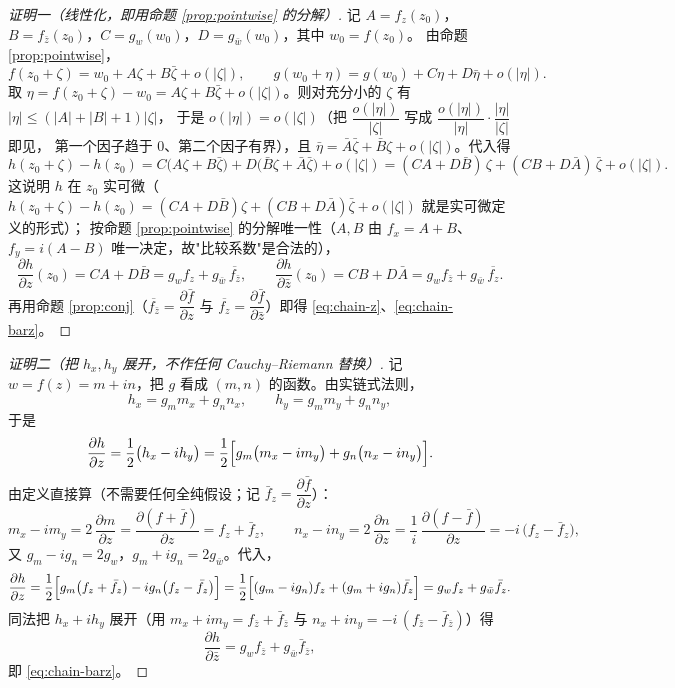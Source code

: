\begin{proof}[证明一（线性化，即用命题 \ref{prop:pointwise} 的分解）]
记 $A=f_z(z_0)$，$B=f_{\bar z}(z_0)$，$C=g_w(w_0)$，$D=g_{\bar w}(w_0)$，其中 $w_0=f(z_0)$。
由命题 \ref{prop:pointwise}，
\[
f(z_0+\zeta)=w_0+A\zeta+B\bar\zeta+o(|\zeta|),\qquad
g(w_0+\eta)=g(w_0)+C\eta+D\bar\eta+o(|\eta|).
\]
取 $\eta=f(z_0+\zeta)-w_0=A\zeta+B\bar\zeta+o(|\zeta|)$。则对充分小的 $\zeta$ 有 $|\eta|\le(|A|+|B|+1)|\zeta|$，
于是 $o(|\eta|)=o(|\zeta|)$（把 $\dfrac{o(|\eta|)}{|\zeta|}$ 写成 $\dfrac{o(|\eta|)}{|\eta|}\cdot\dfrac{|\eta|}{|\zeta|}$ 即见，
第一个因子趋于 $0$、第二个因子有界），且
$\bar\eta=\bar A\bar\zeta+\bar B\zeta+o(|\zeta|)$。代入得
\[
h(z_0+\zeta)-h(z_0)
=C\bigl(A\zeta+B\bar\zeta\bigr)+D\bigl(\bar B\zeta+\bar A\bar\zeta\bigr)+o(|\zeta|)
=(CA+D\bar B)\,\zeta+(CB+D\bar A)\,\bar\zeta+o(|\zeta|).
\]
这说明 $h$ 在 $z_0$ 实可微（$h(z_0+\zeta)-h(z_0)=(CA+D\bar B)\zeta+(CB+D\bar A)\bar\zeta+o(|\zeta|)$ 就是实可微定义的形式）；
按命题 \ref{prop:pointwise} 的分解唯一性（$A,B$ 由 $f_x=A+B$、$f_y=i(A-B)$ 唯一决定，故"比较系数"是合法的），
\[
\frac{\partial h}{\partial z}(z_0)=CA+D\bar B=g_wf_z+g_{\bar w}\,\overline{f_{\bar z}},
\qquad
\frac{\partial h}{\partial\bar z}(z_0)=CB+D\bar A=g_wf_{\bar z}+g_{\bar w}\,\overline{f_z}.
\]
再用命题 \ref{prop:conj}（$\overline{f_{\bar z}}=\dfrac{\partial\bar f}{\partial z}$ 与 $\overline{f_z}=\dfrac{\partial\bar f}{\partial\bar z}$）即得 \eqref{eq:chain-z}、\eqref{eq:chain-barz}。
\end{proof}

\begin{proof}[证明二（把 $h_x,h_y$ 展开，不作任何 Cauchy--Riemann 替换）]
记 $w=f(z)=m+in$，把 $g$ 看成 $(m,n)$ 的函数。由实链式法则，
\[
h_x=g_mm_x+g_nn_x,\qquad h_y=g_mm_y+g_nn_y,
\]
于是
\[
\frac{\partial h}{\partial z}=\frac12\bigl(h_x-ih_y\bigr)
=\frac12\Bigl[g_m\bigl(m_x-im_y\bigr)+g_n\bigl(n_x-in_y\bigr)\Bigr].
\]
由定义直接算（不需要任何全纯假设；记 $\bar f_z=\dfrac{\partial\bar f}{\partial z}$）：
\[
m_x-im_y=2\,\frac{\partial m}{\partial z}=\frac{\partial(f+\bar f)}{\partial z}=f_z+\bar f_z,
\qquad
n_x-in_y=2\,\frac{\partial n}{\partial z}=\frac1i\,\frac{\partial(f-\bar f)}{\partial z}=-i\,\bigl(f_z-\bar f_z\bigr),
\]
又 $g_m-ig_n=2g_w$，$g_m+ig_n=2g_{\bar w}$。代入，
\[
\frac{\partial h}{\partial z}
=\frac12\Bigl[g_m\bigl(f_z+\bar f_z\bigr)-ig_n\bigl(f_z-\bar f_z\bigr)\Bigr]
=\frac12\Bigl[(g_m-ig_n)f_z+(g_m+ig_n)\bar f_z\Bigr]
=g_wf_z+g_{\bar w}\bar f_z .
\]
同法把 $h_x+ih_y$ 展开（用 $m_x+im_y=f_{\bar z}+\bar f_{\bar z}$ 与 $n_x+in_y=-i\,(f_{\bar z}-\bar f_{\bar z})$）得
\[
\frac{\partial h}{\partial \bar z}=g_wf_{\bar z}+g_{\bar w}\bar f_{\bar z},
\]
即 \eqref{eq:chain-barz}。
\end{proof}

